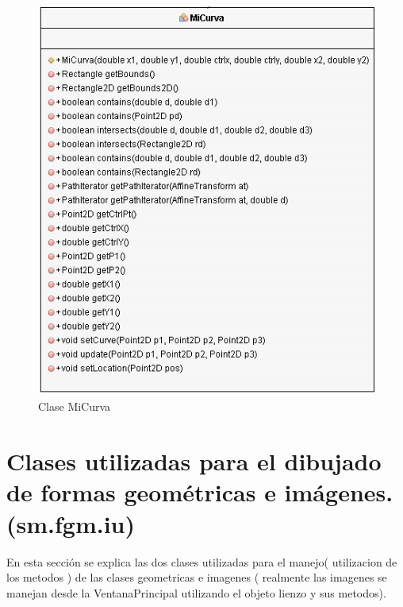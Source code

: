 \begin{figure}[H]
  \centering
    \includegraphics[scale=0.55]{images/micurva2}
  \caption{Clase MiCurva}
  \label{Clases MiCurva}
\end{figure}

\section{Clases utilizadas para el dibujado de formas geométricas e imágenes.(sm.fgm.iu)}
En esta sección se explica las dos clases utilizadas para el manejo( utilizacion de los metodos ) de las clases geometricas e imagenes ( realmente las imagenes se manejan desde la VentanaPrincipal utilizando el objeto lienzo y sus metodos).
